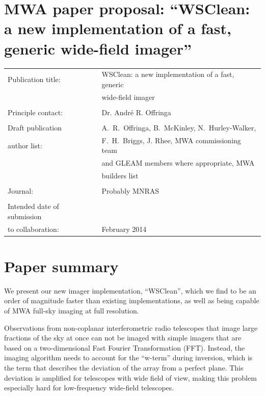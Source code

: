 \documentclass[a4paper,10pt]{article}
\begin{document}
\label{firstpage}
\section*{MWA paper proposal: ``WSClean: a new implementation of a fast, generic wide-field imager''}
\begin{tabular}{ll}
Publication title: & WSClean: a new implementation of a fast, generic \\
                   & wide-field imager\\
                   & \\
Principle contact: & Dr. Andr\'e R. Offringa \\
                   & \\
Draft publication        & A.~R.~Offringa, B.~McKinley, N.~Hurley-Walker, \\
\hspace{5mm}author list: & F.~H.~Briggs, J. Rhee, MWA commissioning team \\
                         & and GLEAM members where appropriate, MWA \\
                         & builders list \\
                   & \\
Journal:           & Probably MNRAS\\
                   & \\
Intended date of submission\\
\hspace{5mm}to collaboration: & February 2014\\
\end{tabular}

\section*{Paper summary}
We present our new imager implementation, ``WSClean'', which we find to be an order of magnitude faster than existing implementations, as well as being capable of MWA full-sky imaging at full resolution.

Observations from non-coplanar interferometric radio telescopes that image large fractions of the sky at once can not be imaged with simple imagers that are based on a two-dimensional Fast Fourier Transformation (FFT). Instead, the imaging algorithm needs to account for the ``w-term'' during inversion, which is the term that describes the deviation of the array from a perfect plane. This deviation is amplified for telescopes with wide field of view, making this problem especially hard for low-frequency wide-field telescopes.
\end{document}

